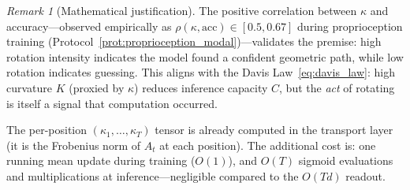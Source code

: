 \documentclass[11pt,a4paper]{article}
\theoremstyle{definition}
\theoremstyle{remark}
\newtheorem{remark}[theorem]{Remark}
\begin{document}
\begin{remark}[Mathematical justification]
The positive correlation between $\kappa$ and accuracy---observed 
empirically as $\rho(\kappa, \mathrm{acc}) \in [0.5, 0.67]$ during 
proprioception training (Protocol~\ref{prot:proprioception_modal})---validates 
the premise: high rotation intensity indicates the model found a 
confident geometric path, while low rotation indicates guessing. 
This aligns with the Davis Law~\eqref{eq:davis_law}: high curvature 
$K$ (proxied by $\kappa$) reduces inference capacity $C$, but the 
\emph{act} of rotating is itself a signal that computation occurred.
\end{remark}

The per-position $(\kappa_1, \ldots, \kappa_T)$ tensor is 
already computed in the transport layer (it is the Frobenius 
norm of $A_t$ at each position). The additional cost is: one 
running mean update during training ($O(1)$), and $O(T)$ 
sigmoid evaluations and multiplications at inference---negligible 
compared to the $O(Td)$ readout.
\end{document}
